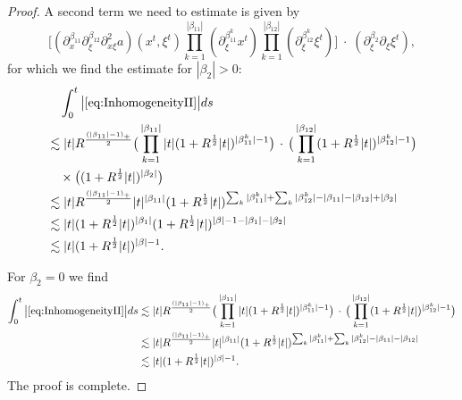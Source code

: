 \documentclass{amsart}
\theoremstyle{definition}
\begin{document}
\begin{proof}
A second term we need to estimate is given by
\begin{equation}
\label{eq:InhomogeneityII}
\big[ (\partial^{\beta_{11}}_x \partial^{\beta_{12}}_{\xi} \partial^2_{x \xi} a)(x^t,\xi^t) \prod_{k=1}^{|\beta_{11}|} (\partial_{\xi}^{\beta_{11}^k} x^t) \prod_{k=1}^{|\beta_{12}|} (\partial_{\xi}^{\beta_{12}^k} \xi^t) \big] \; \cdot \; (\partial_{\xi}^{\beta_2} \partial_{\xi} \xi^t),
\end{equation}
for which we find the estimate for $|\beta_2| > 0$:
 \begin{equation*}
 \begin{split}
	&\quad \int_0^t \big| \eqref{eq:InhomogeneityII} \big| ds \\
 	 &\lesssim |t| R^{\frac{(|\beta_{11}|-1)_+}{2}} \big( \prod_{k=1}^{|\beta_{11}|}  |t| (1+R^{\frac{1}{2}} |t|)^{|\beta_{11}^{k}| - 1} \big) \, \cdot \, \big( \prod_{k=1}^{|\beta_{12}|} (1+ R^{\frac{1}{2}} |t|)^{|\beta_{12}^k| - 1} \big) \\ 	 
 &\quad \times \big( (1+R^{\frac{1}{2}} |t|)^{|\beta_2| } \big) \\
 	&\lesssim |t| R^{\frac{(|\beta_{11}|-1)_+}{2}} |t|^{|\beta_{11}|} (1+ R^{\frac{1}{2}} |t|)^{\sum_k |\beta_{11}^k| + \sum_k |\beta_{12}^k| - |\beta_{11}| - |\beta_{12}| + |\beta_2|} \\
 	&\lesssim |t| (1+ R^{\frac{1}{2}} |t|)^{|\beta_1|} (1+R^{\frac{1}{2}} |t|)^{|\beta| -1 - |\beta_1| - |\beta_2|} \\
 	&\lesssim |t| (1+R^{\frac{1}{2}} |t|)^{|\beta|-1}.
 	\end{split}
 \end{equation*}
 
For $\beta_2 = 0$ we find 
\begin{equation*}
\begin{split}
\int_0^t \big| \eqref{eq:InhomogeneityII} \big| ds &\lesssim |t|  R^{\frac{(|\beta_{11}|-1)_+}{2}} \big( \prod_{k=1}^{|\beta_{11}|}  |t| (1+R^{\frac{1}{2}} |t|)^{|\beta_{11}^{k}| - 1} \big) \, \cdot \, \big( \prod_{k=1}^{|\beta_{12}|} (1+ R^{\frac{1}{2}} |t|)^{|\beta_{12}^k| - 1} \big) \\
&\lesssim |t|  R^{\frac{(|\beta_{11}|-1)_+}{2}} |t|^{|\beta_{11}|} (1+ R^{\frac{1}{2}} |t|)^{\sum_k |\beta_{11}^k| + \sum_k |\beta_{12}^k| - |\beta_{11}| - |\beta_{12}|} \\
&\lesssim |t| (1+ R^{\frac{1}{2}} |t|)^{|\beta|-1}.
\end{split}
\end{equation*}
The proof is complete.
\end{proof}
\end{document}
